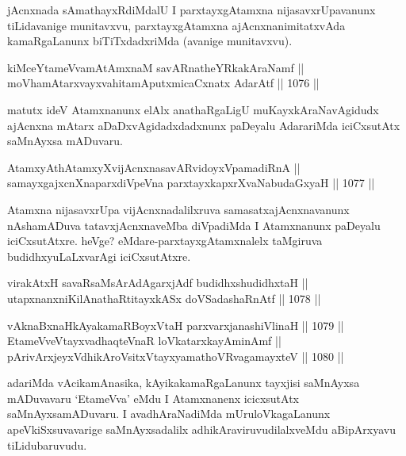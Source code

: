 \begin{artha}
jAcnxnada sAmathayxRdiMdalU I parxtayxgAtamxna nijasavxrUpavanunx tiLidavanige munitavxvu, parxtayxgAtamxna ajAcnxnanimitatxvAda kamaRgaLanunx biTiTxdadxriMda (avanige munitavxvu).
\end{artha}


\begin{shl}
kiMceYtameVvamAtAmxnaM savARnatheYRkakAraNamf || \\
moVhamAtarxvayxvahitamAputxmicaCxnatx AdarAtf ||  1076 ||  
\end{shl}

\begin{artha}
matutx ideV Atamxnanunx elAlx anathaRgaLigU muKayxkAraNavAgidudx ajAcnxna mAtarx aDaDxvAgidadxdadxnunx paDeyalu AdarariMda iciCxsutAtx saMnAyxsa mADuvaru.
\end{artha}


\begin{shl}
AtamxyAthAtamxyXvijAcnxnasavARvidoyxVpamadiRnA || \\
samayxgajxcnXnaparxdiVpeVna parxtayxkapxrXvaNabudaGxyaH ||  1077 ||  
\end{shl}

\begin{artha}
Atamxna nijasavxrUpa vijAcnxnadalilxruva samasatxajAcnxnavanunx nAshamADuva tatavxjAcnxnaveMba diVpadiMda I Atamxnanunx paDeyalu iciCxsutAtxre. heVge? eMdare-parxtayxgAtamxnalelx taMgiruva budidhxyuLaLxvarAgi iciCxsutAtxre.
\end{artha}

\begin{shl}
virakAtxH savaRsaMsArAdAgarxjAdf budidhxshudidhxtaH || \\
utapxnanxniKilAnathaRtitayxkASx doVSadashaRnAtf ||  1078 ||  
\end{shl}
				
\begin{shl}
vAknaBxnaHkAyakamaRBoyxV\s taH parxvarxjanashiVlinaH ||  1079 ||  \\
EtameVveVtayxvadhaqteVnaR loVkatarxkayAminAmf || \\
pArivArxjeyxV\s dhikAroV\s sitxVtayxyamathoVR\s vagamayxteV ||  1080 ||  
\end{shl}

\begin{artha}
adariMda vAcikamAnasika, kAyikakamaRgaLanunx tayxjisi saMnAyxsa mADuvavaru `EtameVva' eMdu I Atamxnanenx icicxsutAtx saMnAyxsamADuvaru. I avadhAraNadiMda mUruloVkagaLanunx apeVkiSxsuvavarige saMnAyxsadalilx adhikAraviruvudilalxveMdu aBipArxyavu tiLidubaruvudu.
\end{artha}

